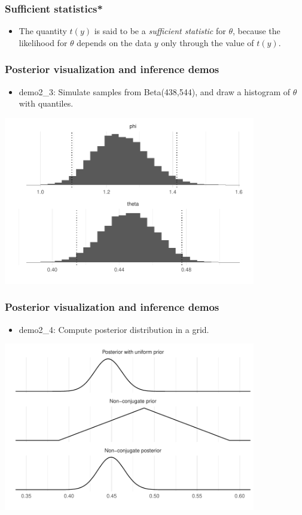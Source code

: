 \documentclass[english,t]{beamer}
\begin{document}

\begin{frame}
  \frametitle{Sufficient statistics*}

  \begin{itemize}
  \item The quantity $t(y)$ is said to be a {\em sufficient statistic}
    for $\theta$, because the likelihood for $\theta$ depends on the
    data $y$ only through the value of $t(y)$.
  \end{itemize}

\end{frame}


\begin{frame}
  \frametitle{Posterior visualization and inference demos}

  \begin{itemize}
  \item demo2\_3: Simulate samples from Beta(438,544), and draw
    a histogram of $\theta$ with quantiles.
  \end{itemize}
  \vspace{-\baselineskip}
  \begin{center}
  \includegraphics[width=11cm]{figs/demo2_3.pdf}
\end{center}
\end{frame}

\begin{frame}
  \frametitle{Posterior visualization and inference demos}

  \begin{itemize}
  \item demo2\_4: Compute posterior distribution in a grid.
  \end{itemize}
  \includegraphics[width=11cm]{figs/demo2_4a.pdf}
\end{frame}
\end{document}
